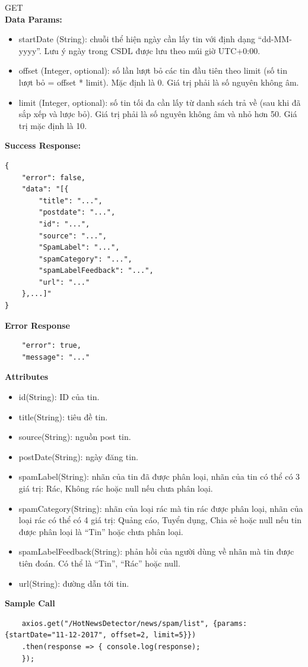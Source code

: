 GET\\
\textbf{Data Params:}
	\begin{itemize}
		\item startDate (String): chuỗi thể hiện ngày cần lấy tin với định dạng “dd-MM-yyyy”. Lưu ý ngày trong CSDL được lưu theo múi giờ UTC+0:00.
		\item offset (Integer, optional): số lần lượt bỏ các tin đầu tiên theo limit (số tin lượt bỏ = offset * limit). Mặc định là 0. Giá trị phải là số nguyên không âm.
		\item limit (Integer, optional): số tin tối đa cần lấy từ danh sách trả về (sau khi đã sắp xếp và lược bỏ). Giá trị phải là số nguyên không âm và nhỏ hơn 50. Giá trị mặc định là 10.
	\end{itemize}
\textbf{Success Response:}	
\begin{lstlisting}
{
	"error": false,
	"data": "[{	
		"title": "...",	
		"postdate": "...",	
		"id": "...",	
		"source": "...",	
		"SpamLabel": "...",	
		"spamCategory": "...",	
		"spamLabelFeedback": "...",	
		"url": "..."	
	},...]"
}
\end{lstlisting}
\textbf{Error Response}
\begin{lstlisting}
	"error": true,		
	"message": "..."
\end{lstlisting}
\textbf{Attributes}
	\begin{itemize}
		\item id(String): ID của tin.	
		\item title(String): tiêu đề tin.	
		\item source(String): nguồn post tin.	
		\item postDate(String): ngày đăng tin.	
		\item spamLabel(String): nhãn của tin đã được phân loại, nhãn của tin có thể có 3 giá trị: Rác, Không rác hoặc null nếu chưa phân loại.
		\item spamCategory(String): nhãn của loại rác mà tin rác được phân loại, nhãn của loại rác có thể có 4 giá trị: Quảng cáo, Tuyển dụng, Chia sẻ hoặc null nếu tin được phân loại là “Tin” hoặc chưa phân loại.
		\item spamLabelFeedback(String): phản hồi của người dùng về nhãn mà tin được tiên đoán. Có thể là “Tin”, “Rác” hoặc null.
		\item url(String): đường dẫn tới tin.
	\end{itemize}
\textbf{Sample Call}
\begin{lstlisting}
	axios.get("/HotNewsDetector/news/spam/list", {params:{startDate="11-12-2017", offset=2, limit=5}})
	.then(response => {	console.log(response);
	});
\end{lstlisting}
